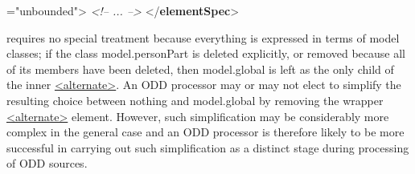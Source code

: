 \begin{shaded}
{\hspace*{1em}\hspace*{1em}\hspace*{1em}\hspace*{1em}{maxOccurs}="{unbounded}">}\mbox{}\newline 
\hspace*{1em}\hspace*{1em}\hspace*{1em}\mbox{}\newline 
\hspace*{1em}\hspace*{1em}\hspace*{1em}\mbox{}\newline 
\hspace*{1em}\hspace*{1em}\mbox{}\newline 
\hspace*{1em}\mbox{}\newline 
{}\mbox{}\newline 
\textit{<!-- ... -->}\mbox{}\newline 
{</\textbf{elementSpec}>}\end{shaded}\egroup\par \noindent  requires no special treatment because everything is expressed in terms of model classes; if the class \textsf{model.personPart} is deleted explicitly, or removed because all of its members have been deleted, then \textsf{model.global} is left as the only child of the inner \hyperref[TEI.alternate]{<alternate>}. An ODD processor may or may not elect to simplify the resulting choice between nothing and \textsf{model.global} by removing the wrapper \hyperref[TEI.alternate]{<alternate>} element. However, such simplification may be considerably more complex in the general case and an ODD processor is therefore likely to be more successful in carrying out such simplification as a distinct stage during processing of ODD sources.\par
